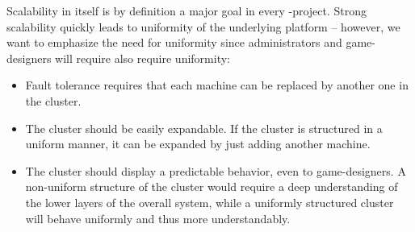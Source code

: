 \documentclass[a4paper, 10pt]{book}
\begin{document}
            Scalability in itself is by definition a major goal in every
            \MMORG-project. Strong scalability quickly leads to uniformity of the
            underlying platform -- however, we want to emphasize the need for
            uniformity since administrators and game-designers will require also
            require uniformity:
            \begin{itemize}
                \item Fault tolerance requires that each machine can be replaced by
                    another one in the cluster. 
                \item The cluster should be easily expandable. If the cluster is
                    structured in a uniform manner, it can be expanded by just adding
                    another machine.
                \item The cluster should display a predictable behavior, even to
                    game-designers. A non-uniform structure of the cluster would require
                    a deep understanding of the lower layers of the overall system,
                    while a uniformly structured cluster will behave uniformly and thus
                    more understandably. 
            \end{itemize}
\end{document}
